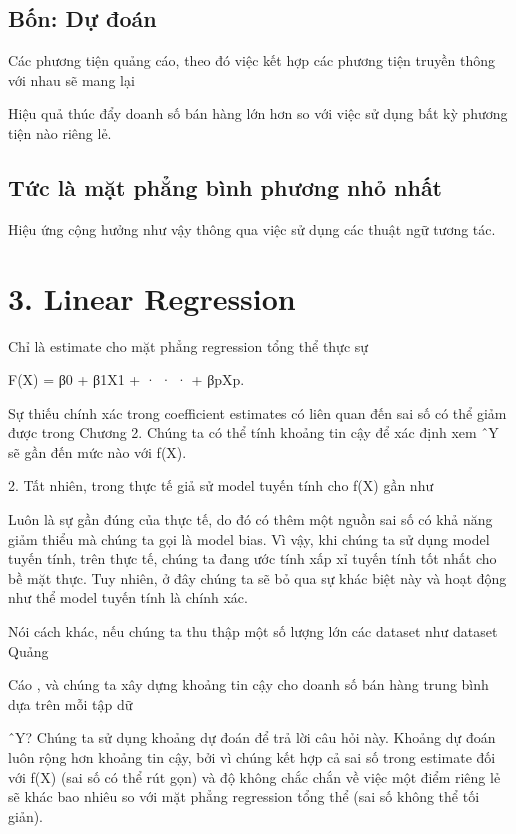 \subsection{Bốn: Dự đoán}

Các phương tiện quảng cáo, theo đó việc kết hợp các phương tiện truyền thông với nhau sẽ mang lại

Hiệu quả thúc đẩy doanh số bán hàng lớn hơn so với việc sử dụng bất kỳ phương tiện nào riêng lẻ.

\subsection{Tức là mặt phẳng bình phương nhỏ nhất}

Hiệu ứng cộng hưởng như vậy thông qua việc sử dụng các thuật ngữ tương tác.

\section{3. Linear Regression}

Chỉ là estimate cho mặt phẳng regression tổng thể thực sự

F(X) = β0 + β1X1 + · · · + βpXp.

Sự thiếu chính xác trong coefficient estimates có liên quan đến sai số có thể giảm được trong Chương 2. Chúng ta có thể tính khoảng tin cậy để xác định xem ˆY sẽ gần đến mức nào với f(X).

2. Tất nhiên, trong thực tế giả sử model tuyến tính cho f(X) gần như

Luôn là sự gần đúng của thực tế, do đó có thêm một nguồn sai số có khả năng giảm thiểu mà chúng ta gọi là model bias. Vì vậy, khi chúng ta sử dụng model tuyến tính, trên thực tế, chúng ta đang ước tính xấp xỉ tuyến tính tốt nhất cho bề mặt thực. Tuy nhiên, ở đây chúng ta sẽ bỏ qua sự khác biệt này và hoạt động như thể model tuyến tính là chính xác.

Nói cách khác, nếu chúng ta thu thập một số lượng lớn các dataset như dataset Quảng

Cáo , và chúng ta xây dựng khoảng tin cậy cho doanh số bán hàng trung bình dựa trên mỗi tập dữ

ˆY? Chúng ta sử dụng khoảng dự đoán để trả lời câu hỏi này. Khoảng dự đoán luôn rộng hơn khoảng tin cậy, bởi vì chúng kết hợp cả sai số trong estimate đối với f(X) (sai số có thể rút gọn) và độ không chắc chắn về việc một điểm riêng lẻ sẽ khác bao nhiêu so với mặt phẳng regression tổng thể (sai số không thể tối giản).

